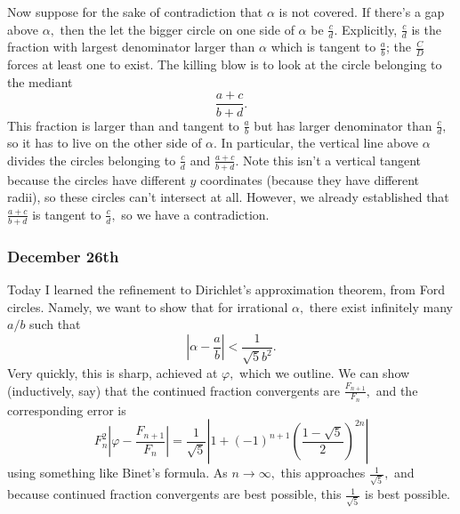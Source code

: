 Now suppose for the sake of contradiction that $\alpha$ is not covered. If there's a gap above $\alpha,$ then the let the bigger circle on one side of $\alpha$ be $\frac cd.$ Explicitly, $\frac cd$ is the fraction with largest denominator larger than $\alpha$ which is tangent to $\frac ab$; the $\frac CD$ forces at least one to exist. The killing blow is to look at the circle belonging to the mediant
\[\frac{a+c}{b+d}.\]
This fraction is larger than and tangent to $\frac ab$ but has larger denominator than $\frac cd,$ so it has to live on the other side of $\alpha.$ In particular, the vertical line above $\alpha$ divides the circles belonging to $\frac cd$ and $\frac{a+c}{b+d}.$ Note this isn't a vertical tangent because the circles have different $y$ coordinates (because they have different radii), so these circles can't intersect at all. However, we already established that $\frac{a+c}{b+d}$ is tangent to $\frac cd,$ so we have a contradiction.

\subsubsection{December 26th}
Today I learned the refinement to Dirichlet's approximation theorem, from Ford circles. Namely, we want to show that for irrational $\alpha,$ there exist infinitely many $a/b$ such that
\[\left|\alpha-\frac ab\right|<\frac1{\sqrt 5b^2}.\]
Very quickly, this is sharp, achieved at $\varphi,$ which we outline. We can show (inductively, say) that the continued fraction convergents are $\frac{F_{n+1}}{F_n},$ and the corresponding error is
\[F_n^2\left|\varphi-\frac{F_{n+1}}{F_n}\right|=\frac1{\sqrt5}\left|1+(-1)^{n+1}\left(\frac{1-\sqrt5}2\right)^{2n}\right|\]
using something like Binet's formula. As $n\to\infty,$ this approaches $\frac1{\sqrt5},$ and because continued fraction convergents are best possible, this $\frac1{\sqrt5}$ is best possible.

